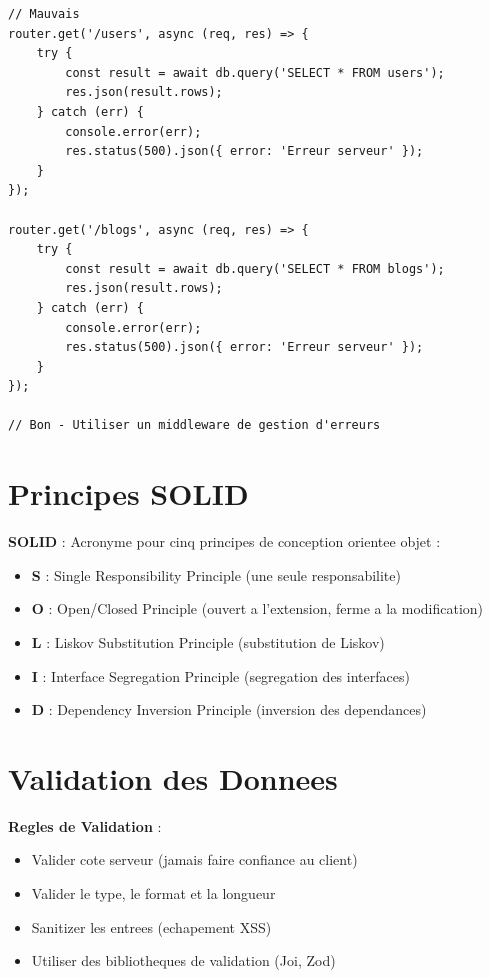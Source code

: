\documentclass[a4paper,12pt]{book}
\begin{document}
\begin{lstlisting}[style=javascript, caption=Eviter la repetition]
// Mauvais
router.get('/users', async (req, res) => {
    try {
        const result = await db.query('SELECT * FROM users');
        res.json(result.rows);
    } catch (err) {
        console.error(err);
        res.status(500).json({ error: 'Erreur serveur' });
    }
});

router.get('/blogs', async (req, res) => {
    try {
        const result = await db.query('SELECT * FROM blogs');
        res.json(result.rows);
    } catch (err) {
        console.error(err);
        res.status(500).json({ error: 'Erreur serveur' });
    }
});

// Bon - Utiliser un middleware de gestion d'erreurs
\end{lstlisting}

\section{Principes SOLID}

\begin{definitionbox}
    \textbf{SOLID} : Acronyme pour cinq principes de conception orientee objet :
    \begin{itemize}
        \item \textbf{S} : Single Responsibility Principle (une seule responsabilite)
        \item \textbf{O} : Open/Closed Principle (ouvert a l'extension, ferme a la modification)
        \item \textbf{L} : Liskov Substitution Principle (substitution de Liskov)
        \item \textbf{I} : Interface Segregation Principle (segregation des interfaces)
        \item \textbf{D} : Dependency Inversion Principle (inversion des dependances)
    \end{itemize}
\end{definitionbox}

\section{Validation des Donnees}

\begin{bestpracticebox}
    \textbf{Regles de Validation} :
    \begin{itemize}
        \item Valider cote serveur (jamais faire confiance au client)
        \item Valider le type, le format et la longueur
        \item Sanitizer les entrees (echapement XSS)
        \item Utiliser des bibliotheques de validation (Joi, Zod)
    \end{itemize}
\end{bestpracticebox}
\end{document}
